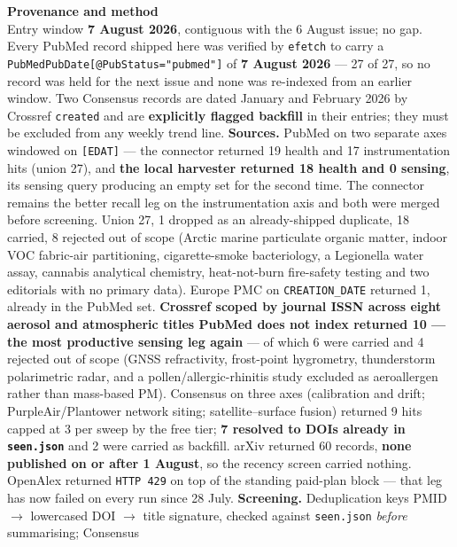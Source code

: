 \documentclass[10pt]{article}
\begin{document}
\vspace{4mm}
\begin{keybox}
{\sffamily\bfseries\footnotesize\color{Deep}Provenance and method}\\[1.2mm]
{\fontsize{7.2}{8.8}\selectfont
Entry window \textbf{7 August 2026}, contiguous with the 6 August issue; no gap. Every
PubMed record shipped here was verified by \texttt{efetch} to carry a
\texttt{PubMedPubDate[@PubStatus="pubmed"]} of \textbf{7 August 2026} --- 27 of 27, so no
record was held for the next issue and none was re-indexed from an earlier window. Two
Consensus records are dated January and February 2026 by Crossref \texttt{created} and are
\textbf{explicitly flagged backfill} in their entries; they must be excluded from any
weekly trend line.
\textbf{Sources.} PubMed on two separate axes windowed on \texttt{[EDAT]} --- the connector
returned 19 health and 17 instrumentation hits (union 27), and \textbf{the local harvester
returned 18 health and 0 sensing}, its sensing query producing an empty set for the second
time. The connector remains the better recall leg on the instrumentation axis and both
were merged before screening. Union 27, 1 dropped as an already-shipped duplicate, 18
carried, 8 rejected out of scope (Arctic marine particulate organic matter, indoor VOC
fabric-air partitioning, cigarette-smoke bacteriology, a Legionella water assay, cannabis
analytical chemistry, heat-not-burn fire-safety testing and two editorials with no primary
data). Europe PMC on \texttt{CREATION\_DATE} returned 1, already in the PubMed set.
\textbf{Crossref scoped by journal ISSN across eight aerosol and atmospheric titles PubMed
does not index returned 10 --- the most productive sensing leg again} --- of which 6 were
carried and 4 rejected out of scope (GNSS refractivity, frost-point hygrometry, thunderstorm
polarimetric radar, and a pollen/allergic-rhinitis study excluded as aeroallergen rather
than mass-based PM). Consensus on three axes (calibration and drift; PurpleAir/Plantower
network siting; satellite--surface fusion) returned 9 hits capped at 3 per sweep by the
free tier; \textbf{7 resolved to DOIs already in \texttt{seen.json}} and 2 were carried as
backfill. arXiv returned 60 records, \textbf{none published on or after 1 August}, so the
recency screen carried nothing. OpenAlex returned \texttt{HTTP 429} on top of the standing
paid-plan block --- that leg has now failed on every run since 28 July.
\textbf{Screening.} Deduplication keys PMID $\rightarrow$ lowercased DOI $\rightarrow$
title signature, checked against \texttt{seen.json} \emph{before} summarising; Consensus
}
\end{keybox}
\end{document}
